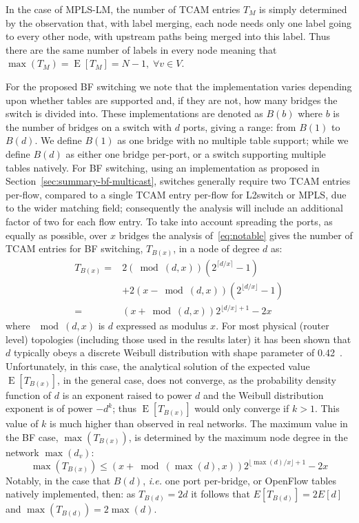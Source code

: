 \documentclass[conference]{IEEEtran}
\DeclareMathOperator{\E}{E}
\newcommand{\ie}{\emph{i.e.}\xspace}
\begin{document}
In the case of MPLS-LM, the number of TCAM entries $T_M$ is simply determined by the observation that, with label merging, each node needs only one label going to every other node, with upstream paths being merged into this label. Thus there are the same number of labels in every node meaning that $\max(T_M) = \E[T_M] = N-1, \; \forall v \in V $.

For the proposed BF switching we note that the implementation varies depending upon whether tables are supported and, if they are not, how many bridges the switch is divided into. These implementations are denoted as $B(b)$ where $b$ is the number of bridges on a switch with $d$ ports, giving a range: from $B(1)$ to $B(d)$.  We define $B(1)$ as one bridge with no multiple table support; while we define $B(d)$ as either one bridge per-port, or a switch supporting multiple tables natively. For BF switching, using an implementation as proposed in Section~\ref{sec:summary-bf-multicast}, switches generally require two TCAM entries per-flow, compared to a single TCAM entry per-flow for L2switch or MPLS, due to the wider matching field; consequently the analysis will include an additional factor of two for each flow entry. To take into account spreading the ports, as equally as possible, over $x$ bridges the analysis of~\eqref{eq:notable} gives the number of TCAM entries for BF switching, $T_{B(x)}$, in a node of degree $d$ as:
\begin{align}
T_{B(x)}= &2(\bmod(d,x)) (2^{\lceil d/x \rceil}-1) \nonumber \\
 &+ 2(x- \bmod(d,x)) (2^{\lfloor d/x \rfloor}-1)\nonumber \\
= & (x+\bmod(d,x)) 2^{\lfloor d/x \rfloor +1} -2x
\label{eq:Tb}
\end{align}
where $\mod(d,x)$ is $d$ expressed as modulus $x$. For most physical (router level) topologies (including those used in the results later) it
has been shown that $d$ typically obeys a discrete Weibull
distribution with shape parameter of 0.42~\cite{Spring02}. Unfortunately, in this case, the analytical solution of the expected value  $\E[T_{B(x)}]$, in the general case, does not converge, as the probability density function of $d$ is an exponent raised to power $d$ and the Weibull distribution exponent is of power $-d^k$; thus $\E[T_{B(x)}]$ would only converge if $k>1$. This value of $k$ is much higher than observed in real networks.
The maximum value in the BF case, $\max(T_{B(x)})$, is determined by the maximum node degree in the network $\max(d_v)$:
\begin{equation}
\max(T_{B(x)}) \leq (x+\bmod(\max(d),x)) 2^{\lfloor \max(d)/x \rfloor +1} -2x
\label{eq:maxTb}
\end{equation}
Notably,  in the case that $B(d)$, \ie one port per-bridge, or OpenFlow tables natively implemented, then: as $T_{B(d)}=2d$ it follows that $E[T_{B(d)}]=2E[d]$ and $\max(T_{B(d)})=2\max(d)$.
\end{document}
